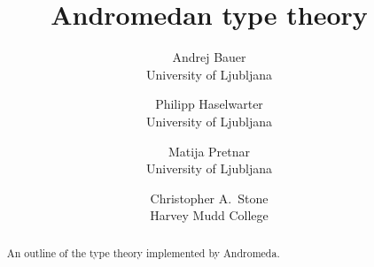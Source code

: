\documentclass{article}
\begin{document}
\title{Andromedan type theory}
\author{
Andrej Bauer \\ University of Ljubljana
\and
Philipp Haselwarter \\ University of Ljubljana
\and
Matija Pretnar \\ University of Ljubljana
\and
Christopher A.~Stone \\ Harvey Mudd College}

\maketitle

\begin{abstract}
  An outline of the type theory implemented by Andromeda.
\end{abstract}




\end{document}
